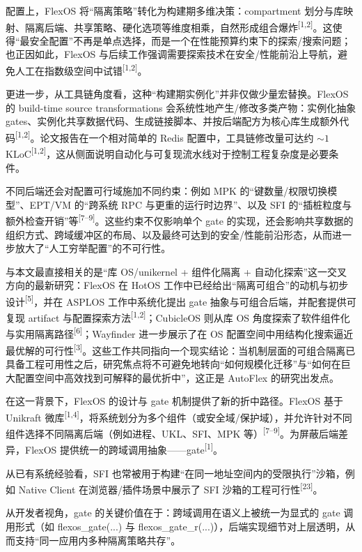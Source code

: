 \documentclass[UTF8,a4paper,12pt,twoside]{ctexart}  %
\begin{document}
配置上，FlexOS 将“隔离策略”转化为构建期多维决策：compartment 划分与库映射、隔离后端、共享策略、硬化选项等维度相乘，自然形成组合爆炸\textsuperscript{[1,2]}。这使得“最安全配置”不再是单点选择，而是一个在性能预算约束下的探索/搜索问题；也正因如此，FlexOS 与后续工作强调需要探索技术在安全/性能前沿上导航，避免人工在指数级空间中试错\textsuperscript{[1,2]}。

更进一步，从工具链角度看，这种“构建期实例化”并非仅做少量宏替换。FlexOS 的 build-time source transformations 会系统性地产生/修改多类产物：实例化抽象 gates、实例化共享数据代码、生成链接脚本、并按后端配方为核心库生成额外代码\textsuperscript{[1,2]}。论文报告在一个相对简单的 Redis 配置中，工具链修改量可达约 $\sim 1$ KLoC\textsuperscript{[1,2]}，这从侧面说明自动化与可复现流水线对于控制工程复杂度是必要条件。

不同后端还会对配置可行域施加不同约束：例如 MPK 的“键数量/权限切换模型”、EPT/VM 的“跨系统 RPC 与更重的运行时边界”、以及 SFI 的“插桩粒度与额外检查开销”等\textsuperscript{[7--9]}。这些约束不仅影响单个 gate 的实现，还会影响共享数据的组织方式、跨域缓冲区的布局、以及最终可达到的安全/性能前沿形态，从而进一步放大了“人工穷举配置”的不可行性。

与本文最直接相关的是``库 OS/unikernel + 组件化隔离 +
自动化探索''这一交叉方向的最新研究：FlexOS 在 HotOS
工作中已经给出``隔离可组合''的动机与初步设计\textsuperscript{[5]}，并在
ASPLOS 工作中系统化提出 gate
抽象与可组合后端，并配套提供可复现 artifact
与配置探索方法\textsuperscript{[1,2]}；CubicleOS 则从库 OS
角度探索了软件组件化与实用隔离路径\textsuperscript{[6]}；Wayfinder 进一步展示了在 OS
配置空间中用结构化搜索逼近最优解的可行性\textsuperscript{[3]}。这些工作共同指向一个现实结论：当机制层面的可组合隔离已具备工程可用性之后，研究焦点将不可避免地转向``如何规模化迁移''与``如何在巨大配置空间中高效找到可解释的最优折中''，这正是
AutoFlex 的研究出发点。

在这一背景下，FlexOS 的设计与 gate 机制提供了新的折中路径。FlexOS 基于 Unikraft
微库\textsuperscript{[1,4]}，将系统划分为多个组件（或安全域/保护域），并允许针对不同组件选择不同隔离后端（例如进程、UKL、SFI、MPK
等）\textsuperscript{[7--9]}。为屏蔽后端差异，FlexOS
提供统一的跨域调用抽象------gate\textsuperscript{[1]}。

从已有系统经验看，SFI
也常被用于构建``在同一地址空间内的受限执行''沙箱，例如 Native Client
在浏览器/插件场景中展示了 SFI 沙箱的工程可行性\textsuperscript{[23]}。

从开发者视角，gate 的关键价值在于：跨域调用在语义上被统一为显式的 gate
调用形式（如 flexos\_gate(...) 与
flexos\_gate\_r(...)），后端实现细节对上层透明，从而支持``同一应用内多种隔离策略共存''。
\end{document}

